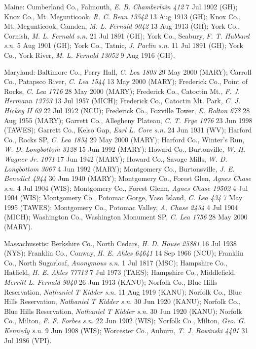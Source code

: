 \documentclass{article}
\begin{document}
Maine:
Cumberland Co., Falmouth, \textit{E. B. Chamberlain 412} 7 Jul 1902 (GH);
Knox Co., Mt. Megunticook, \textit{R. C. Bean 13542} 13 Aug 1913 (GH);
Knox Co., Mt. Megunticook, Camden, \textit{M. L. Fernald 9042} 13 Aug 1913 (GH);
York Co., Cornish, \textit{M. L. Fernald s.n.} 21 Jul 1891 (GH);
York Co., Seabury, \textit{F. T. Hubbard s.n.} 5 Aug 1901 (GH);
York Co., Tatnic, \textit{J. Parlin s.n.} 11 Jul 1891 (GH);
York Co., York River, \textit{M. L. Fernald 13052} 9 Aug 1916 (GH).

Maryland:
Baltimore Co., Perry Hall, \textit{C. Lea 1803} 29 May 2000 (MARY);
Carroll Co., Patapsco River, \textit{C. Lea 1544} 13 May 2000 (MARY);
Frederick Co., Point of Rocks, \textit{C. Lea 1716} 28 May 2000 (MARY);
Frederick Co., Catoctin Mt., \textit{F. J. Hermann 13753} 13 Jul 1957 (MICH);
Frederick Co., Catoctin Mt. Park, \textit{C. J. Hickey II 69} 22 Jul 1972 (NCU);
Frederick Co., Foxville Tower, \textit{E. Bolton 678} 28 Aug 1955 (MARY);
Garrett Co., Allegheny Plateau, \textit{C. T. Frye 1076} 23 Jun 1998 (TAWES);
Garrett Co., Kelso Gap, \textit{Earl L. Core s.n.} 24 Jun 1931 (WV);
Harford Co., Rocks SP, \textit{C. Lea 1854} 29 May 2000 (MARY);
Harford Co., Winter's Run, \textit{W. D. Longbottom 3128} 15 Jun 1992 (MARY);
Howard Co., Burtonville, \textit{W. H. Wagner Jr. 1071} 17 Jun 1942 (MARY);
Howard Co., Savage Mills, \textit{W. D. Longbottom 3067} 4 Jun 1992 (MARY);
Montgomery Co., Burtonsville, \textit{J. E. Benedict 4944} 30 Jun 1940 (MARY);
Montgomery Co., Forest Glen, \textit{Agnes Chase s.n.} 4 Jul 1904 (WIS);
Montgomery Co., Forest Glenn, \textit{Agnes Chase 19502} 4 Jul 1904 (WIS);
Montgomery Co., Potomac Gorge, Vaso Island, \textit{C. Lea 434} 7 May 1995 (TAWES);
Montgomery Co., Potomac Valley, \textit{A. Chase 2434} 4 Jul 1904 (MICH);
Washington Co., Washington Monument SP, \textit{C. Lea 1756} 28 May 2000 (MARY).

Massachusetts:
Berkshire Co., North Cedars, \textit{H. D. House 25881} 16 Jul 1938 (NYS);
Franklin Co., Conway, \textit{H. E. Ahles 64641} 14 Sep 1966 (NCU);
Franklin Co., North Sugarloaf, \textit{Anonymous s.n.} 1 Jul 1817 (MSC);
Hampshire Co., Hatfield, \textit{H. E. Ahles 77713} 7 Jul 1973 (TAES);
Hampshire Co., Middlefield, \textit{Merritt L. Fernald 9040} 26 Jun 1913 (KANU);
Norfolk Co., Blue Hills Reservation, \textit{Nathaniel T Kidder s.n.} 11 Aug 1919 (KANU);
Norfolk Co., Blue Hills Reservation, \textit{Nathaniel T Kidder s.n.} 30 Jun 1920 (KANU);
Norfolk Co., Blue Hills Reservation, \textit{Nathaniel T Kidder s.n.} 30 Jun 1920 (KANU);
Norfolk Co., Milton, \textit{F. F. Forbes s.n.} 22 Jun 1902 (WIS);
Norfolk Co., Milton, \textit{Geo. G. Kennedy s.n.} 9 Jun 1908 (WIS);
Worcester Co., Auburn, \textit{T. J. Rawinski 4401} 31 Jul 1986 (VPI).
\end{document}
